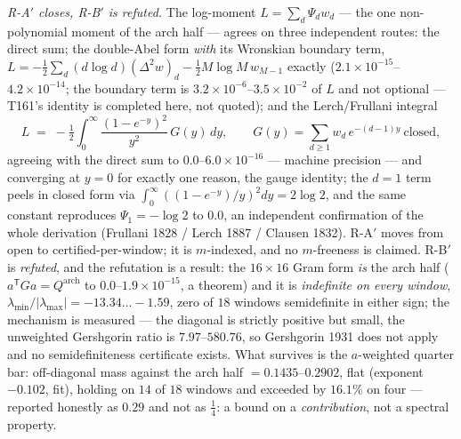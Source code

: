 \documentclass[11pt,a4paper]{article}
\begin{document}
\emph{R-A$'$ closes, R-B$'$ is refuted.} The log-moment $L=\sum_d\Psi_dw_d$ ---
the one non-polynomial moment of the arch half --- agrees on three independent
routes: the direct sum; the double-Abel form \emph{with} its Wronskian boundary
term, $L=-\tfrac12\sum_d(d\log d)(\Delta^2w)_d-\tfrac12M\log M\,w_{M-1}$
exactly ($2.1\times10^{-15}$--$4.2\times10^{-14}$; the boundary term is
$3.2\times10^{-6}$--$3.5\times10^{-2}$ of $L$ and not optional --- T161's
identity is completed here, not quoted); and the Lerch/Frullani integral
\[
L\;=\;-\tfrac12\int_0^\infty\frac{(1-e^{-y})^2}{y^{2}}\,G(y)\,dy,\qquad
G(y)=\sum_{d\ge1}w_d\,e^{-(d-1)y}\ \text{closed},
\]
agreeing with the direct sum to $0.0$--$6.0\times10^{-16}$ --- machine
precision --- and converging at $y=0$ for exactly one reason, the gauge
identity; the $d=1$ term peels in closed form via
$\int_0^\infty((1-e^{-y})/y)^2dy=2\log2$, and the same constant reproduces
$\Psi_1=-\log2$ to $0.0$, an independent confirmation of the whole derivation
(Frullani 1828 / Lerch 1887 / Clausen 1832). R-A$'$ moves from open to
certified-per-window; it is $m$-indexed, and no $m$-freeness is claimed. R-B$'$
is \emph{refuted}, and the refutation is a result: the $16\times16$ Gram form
\emph{is} the arch half ($a^{\mathsf T}Ga=Q^{\mathrm{arch}}$ to
$0.0$--$1.9\times10^{-15}$, a theorem) and it is \emph{indefinite on every
window}, $\lambda_{\min}/|\lambda_{\max}|=-13.34\ldots-1.59$, zero of $18$
windows semidefinite in either sign; the mechanism is measured --- the diagonal
is strictly positive but small, the unweighted Gershgorin ratio is
$7.97$--$580.76$, so Gershgorin 1931 does not apply and no semidefiniteness
certificate exists. What survives is the $a$-weighted quarter bar: off-diagonal
mass against the arch half $=0.1435$--$0.2902$, flat (exponent $-0.102$, fit),
holding on $14$ of $18$ windows and exceeded by $16.1\%$ on four --- reported
honestly as $0.29$ and not as $\tfrac14$: a bound on a \emph{contribution}, not
a spectral property.
\end{document}
